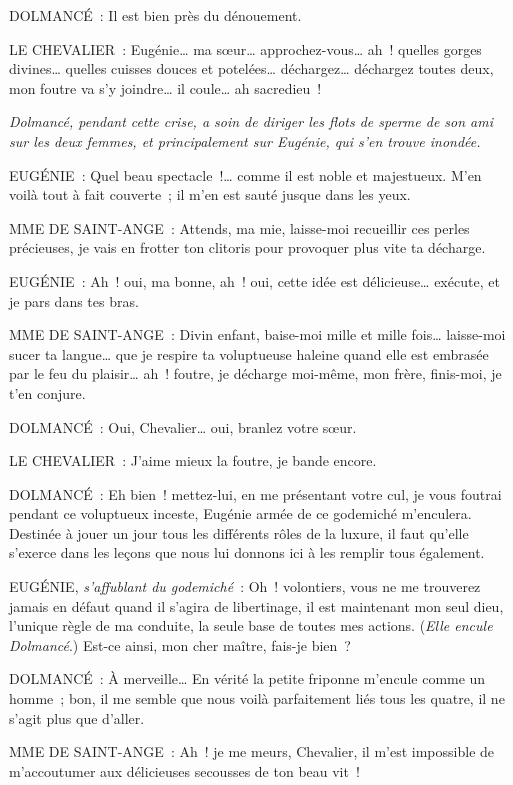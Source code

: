 \documentclass[french,twoside]{book} %
\begin{document}
DOLMANCÉ : Il est bien près du dénouement.\par
LE CHEVALIER : Eugénie… ma sœur… approchez-vous… ah ! quelles gorges divines… quelles cuisses douces et potelées… déchargez… déchargez toutes deux, mon foutre va s’y joindre… il coule… ah sacredieu !\par
{\itshape Dolmancé, pendant cette crise, a soin de diriger les flots de sperme de son ami sur les deux femmes, et principalement sur Eugénie, qui s’en trouve inondée. }\par
EUGÉNIE : Quel beau spectacle !… comme il est noble et majestueux. M’en voilà tout à fait couverte ; il m’en est sauté jusque dans les yeux.\par
MME DE SAINT-ANGE : Attends, ma mie, laisse-moi recueillir ces perles précieuses, je vais en frotter ton clitoris pour provoquer plus vite ta décharge.\par
EUGÉNIE : Ah ! oui, ma bonne, ah ! oui, cette idée est délicieuse… exécute, et je pars dans tes bras.\par
MME DE SAINT-ANGE : Divin enfant, baise-moi mille et mille fois… laisse-moi sucer ta langue… que je respire ta voluptueuse haleine quand elle est embrasée par le feu du plaisir… ah ! foutre, je décharge moi-même, mon frère, finis-moi, je t’en conjure.\par
DOLMANCÉ : Oui, Chevalier… oui, branlez votre sœur.\par
LE CHEVALIER : J’aime mieux la foutre, je bande encore.\par
DOLMANCÉ : Eh bien ! mettez-lui, en me présentant votre cul, je vous foutrai pendant ce voluptueux inceste, Eugénie armée de ce godemiché m’enculera. Destinée à jouer un jour tous les différents rôles de la luxure, il faut qu’elle s’exerce dans les leçons que nous lui donnons ici à les remplir tous également.\par
EUGÉNIE, {\itshape s’affublant du godemiché} : Oh ! volontiers, vous ne me trouverez jamais en défaut quand il s’agira de libertinage, il est maintenant mon seul dieu, l’unique règle de ma conduite, la seule base de toutes mes actions. ({\itshape Elle encule Dolmancé}.) Est-ce ainsi, mon cher maître, fais-je bien ?\par
DOLMANCÉ : À merveille… En vérité la petite friponne m’encule comme un homme ; bon, il me semble que nous voilà parfaitement liés tous les quatre, il ne s’agit plus que d’aller.\par
MME DE SAINT-ANGE : Ah ! je me meurs, Chevalier, il m’est impossible de m’accoutumer aux délicieuses secousses de ton beau vit !\par
\end{document}
